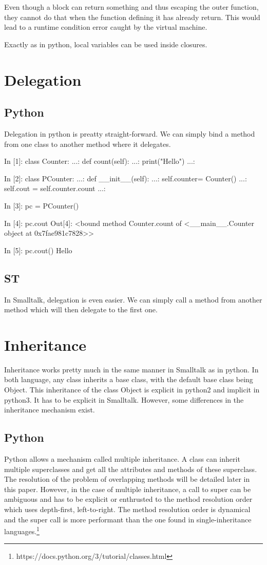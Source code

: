 \documentclass[12pt,a4paper]{scrartcl}
\begin{document}
\begin{multicols}{2}
Even though a block can return something and thus escaping the outer function, they cannot do that when the function defining it has already return. This would lead to a runtime condition error caught by the virtual machine.

Exactly as in python, local variables can be used inside closures.

\section{Delegation}
\subsection{Python}
Delegation in python is preatty straight-forward. We can simply bind a method from one class to another method where it delegates.
\begin{python}
In [1]: class Counter:
   ...:     def count(self):
   ...:         print("Hello")
   ...:         

In [2]: class PCounter:
   ...:     def __init__(self):
   ...:         self.counter= Counter()
   ...:         self.cout = self.counter.count
   ...:         

In [3]: pc = PCounter()

In [4]: pc.cout
Out[4]: <bound method Counter.count of <__main__.Counter object at 0x7fae981c7828>>

In [5]: pc.cout()
Hello
\end{python}
\subsection{ST}
In Smalltalk, delegation is even easier. We can simply call a method from another method which will then delegate to the first one.


\section{Inheritance}
Inheritance works pretty much in the same manner in Smalltalk as in python. In both language, any class inherits a base class, with the default base class being Object.
This inheritance of the class Object is explicit in python2 and implicit in python3. It has to be explicit in Smalltalk.
However, some differences in the inheritance mechanism exist.
\subsection{Python}
Python allows a mechanism called multiple inheritance. A class can inherit multiple superclasses and get all the attributes and methods of these superclass. The resolution of the problem of overlapping methods will be detailed later in this paper. However, in the case of multiple inheritance, a call to super can be ambiguous and has to be explicit or enthrusted to the method resolution order which uses depth-first, left-to-right. The method resolution order is dynamical and the super call is more performant than the one found in single-inheritance languages.\footnote{https://docs.python.org/3/tutorial/classes.html}


\end{multicols}
\end{document}
